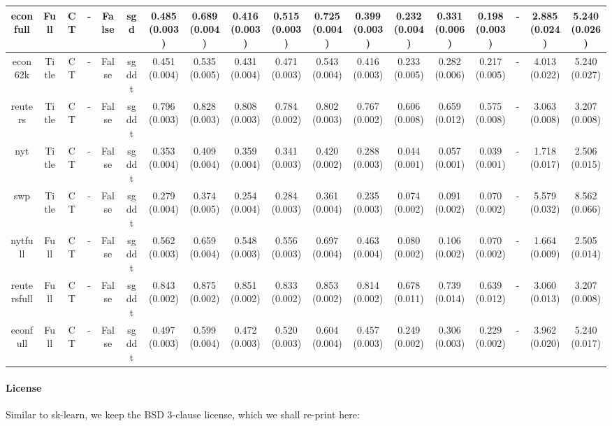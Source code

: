 \documentclass{article}
\begin{document}
{\begin{landscape}
\begin{table}[!h]
{\begin{tabular}{@{}cccccccccccccccccc@{}}
\midrule econfull & Full & CT & - & False & sgd & 0.485 (0.003) & 0.689 (0.004) & 0.416 (0.003) & 0.515 (0.003) & 0.725 (0.004) & 0.399 (0.003) & 0.232 (0.004) & 0.331 (0.006) & 0.198 (0.003) &- & 2.885 (0.024) & 5.240 (0.026)\\
\midrule econ62k & Title & CT & - & False & sgddt & 0.451 (0.004) & 0.535 (0.005) & 0.431 (0.004) & 0.471 (0.003) & 0.543 (0.004) & 0.416 (0.003) & 0.233 (0.005) & 0.282 (0.006) & 0.217 (0.005) &- & 4.013 (0.022) & 5.240 (0.027)\\
\midrule reuters & Title & CT & - & False & sgddt & 0.796 (0.003) & 0.828 (0.003) & 0.808 (0.003) & 0.784 (0.002) & 0.802 (0.003) & 0.767 (0.002) & 0.606 (0.008) & 0.659 (0.012) & 0.575 (0.008) &- & 3.063 (0.008) & 3.207 (0.008)\\
\midrule nyt & Title & CT & - & False & sgddt & 0.353 (0.004) & 0.409 (0.004) & 0.359 (0.004) & 0.341 (0.003) & 0.420 (0.002) & 0.288 (0.003) & 0.044 (0.001) & 0.057 (0.001) & 0.039 (0.001) &- & 1.718 (0.017) & 2.506 (0.015)\\
\midrule swp & Title & CT & - & False & sgddt & 0.279 (0.004) & 0.374 (0.005) &
0.254 (0.004) & 0.284 (0.003) & 0.361 (0.004) & 0.235 (0.003) & 0.074 (0.002) & 0.091 (0.002) & 0.070 (0.002) &- & 5.579 (0.032) & 8.562 (0.066)\\
\midrule nytfull & Full & CT & - & False & sgddt & 0.562 (0.003) & 0.659 (0.004) & 0.548 (0.003) & 0.556 (0.003) & 0.697 (0.004) & 0.463 (0.004) & 0.080 (0.002) & 0.106 (0.002) & 0.070 (0.002) &- & 1.664 (0.009) & 2.505 (0.014)\\
\midrule reutersfull & Full & CT & - & False & sgddt & 0.843 (0.002) & 0.875 (0.002) & 0.851 (0.002) & 0.833 (0.002) & 0.853 (0.002) & 0.814 (0.002) & 0.678 (0.011) & 0.739 (0.014) & 0.639 (0.012) &- & 3.060 (0.013) & 3.207 (0.008)\\
\midrule econfull & Full & CT & - & False & sgddt & 0.497 (0.003) & 0.599 (0.004) & 0.472 (0.003) & 0.520 (0.003) & 0.604 (0.004) & 0.457 (0.003) & 0.249 (0.002) & 0.306 (0.003) & 0.229 (0.002) &- & 3.962 (0.020) & 5.240 (0.017)\\
                          \end{tabular}}
                          \end{table}



\end{landscape}
}


\paragraph{License}
Similar to sk-learn, we keep the BSD 3-clause license, which we shall re-print here:
\end{document}
